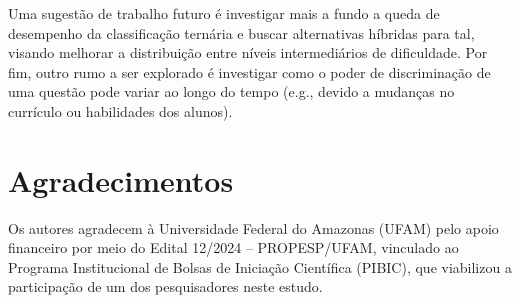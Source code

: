 \documentclass[12pt]{article}
\begin{document}
Uma sugestão de trabalho futuro é investigar mais a fundo a queda de desempenho da classificação ternária e buscar alternativas híbridas para tal, visando melhorar a distribuição entre níveis intermediários de dificuldade. Por fim, outro rumo a ser explorado é investigar como o poder de discriminação de uma questão pode variar ao longo do tempo (e.g., devido a mudanças no currículo ou habilidades dos alunos). 

\section*{Agradecimentos}

Os autores agradecem à Universidade Federal do Amazonas (UFAM) pelo apoio financeiro por meio do Edital 12/2024 -- PROPESP/UFAM, vinculado ao Programa Institucional de Bolsas de Iniciação Científica (PIBIC), que viabilizou a participação de um dos pesquisadores neste estudo.



\end{document}
